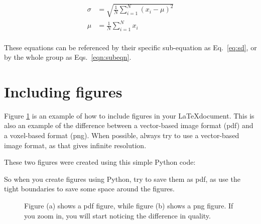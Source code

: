 \begin{subequations}
\begin{align}
    \sigma &= \sqrt{\frac{1}{N} \sum_{i=1}^N (x_i - \mu)^2}
    \label{eq:sd}\\ 
    \mu &= \frac{1}{N} \sum_{i=1}^N x_i \label{eq:mean}
\end{align}
\label{eqn:subeqn}
\end{subequations}\\
These equations can be referenced by their specific sub-equation as Eq.~\eqref{eq:sd}, or by the whole group as Eqs.~\eqref{eqn:subeqn}.


\section{Including figures}

Figure \ref{fig:qualityDiff} is an example of how to include figures in your \LaTeX document. This is also an example of the difference between a vector-based image format (pdf) and a voxel-based format (png). When possible, always try to use a vector-based image format, as that gives infinite resolution.

These two figures were created using this simple Python code:



So when you create figures using Python, try to save them as pdf, as use the tight boundaries to save some space around the figures.

\begin{figure}[H]
  \centering
  \quad
  \caption{Figure (a) shows a pdf figure, while figure (b) shows a png figure. If you zoom in, you will start noticing the difference in quality.}
\label{fig:qualityDiff}
\end{figure}

